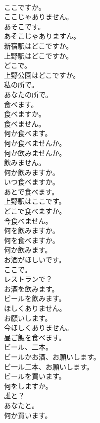 \documentclass[8pt]{extreport}
\begin{document}
\begin{CJK}{UTF8}{min}
\\	ここですか。	
\\	ここじゃありません。	
\\	あそこです。	
\\	あそこじゃありますん。	
\\	新宿駅はどこですか。	
\\	上野駅はどこですか。	
\\	どこで。	
\\	上野公園はどこですか。	
\\	私の所で。	
\\	あなたの所で。	
\\	食べます。	
\\	食べますか。	
\\	食べません。	
\\	何か食べます。	
\\	何か食べませんか。	
\\	何か飲みませんか。	
\\	飲みません。	
\\	何か飲みますか。	
\\	いつ食べますか。	
\\	あとで食べます。	
\\	上野駅はここです。	
\\	どこで食べますか。	
\\	今食べません。	
\\	何を飲みますか。	
\\	何を食べますか。	
\\	何か飲みます。	
\\	お酒がほしいです。	
\\	ここで。	
\\	レストランで？	
\\	お酒を飲みます。	
\\	ビールを飲みます。	
\\	ほしくありません。	
\\	お願いします。	
\\	今ほしくありません。	
\\	昼ご飯を食べます。	
\\	ビール、二本。	
\\	ビールかお酒、お願いします。	
\\	ビ一ル二本、お願いします。	
\\	ビールを買います。	
\\	何をしますか。	
\\	誰と？	
\\	あなたと。	
\\	何か買います。	

\end{CJK}
\end{document}
